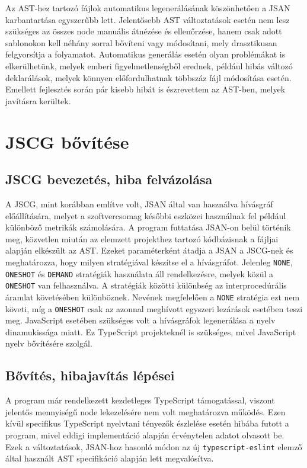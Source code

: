 Az AST-hez tartozó fájlok automatikus legenerálásának köszönhetően a JSAN karbantartása egyszerűbb lett. Jelentősebb AST változtatások esetén nem lesz szükséges az összes node manuális átnézése és ellenőrzése, hanem csak adott sablonokon kell néhány sorral bővíteni vagy módosítani, mely drasztikusan felgyorsítja a folyamatot. Automatikus generálás esetén olyan problémákat is elkerülhetünk, melyek emberi figyelmetlenségből erednek, például hibás változó deklarálások, melyek könnyen előfordulhatnak többszáz fájl módosítása esetén. Emellett fejlesztés során pár kisebb hibát is észrevettem az AST-ben, melyek javításra kerültek. 

\section{JSCG bővítése}

\subsection{JSCG bevezetés, hiba felvázolása}
A JSCG, mint korábban említve volt, JSAN által van használva hívásgráf előállítására, melyet a szoftvercsomag későbbi eszközei használnak fel például különböző metrikák számolására. A program futtatása JSAN-on belül történik meg, közvetlen miután az elemzett projekthez tartozó kódbázisnak a fájljai alapján elkészült az AST. Ezeket paraméterként átadja a JSAN a JSCG-nek és meghatározza, hogy milyen stratégiával készítse el a hívásgráfot. Jelenleg \texttt{NONE}, \texttt{ONESHOT} és \texttt{DEMAND} stratégiák használata áll rendelkezésre, melyek közül a \texttt{ONESHOT} van felhasználva. A stratégiák közötti különbség az interprocedúrális áramlat követésében különböznek. Nevének megfelelően a \texttt{NONE} stratégia ezt nem követi, míg a \texttt{ONESHOT} csak az azonnal meghívott egyszeri lezárások esetében teszi meg.
JavaScript esetében szükséges volt a hívásgráfok legenerálása a nyelv dinamukissága miatt\cite{feldthaus2013efficient}. Ez TypeScript projekteknél is szükséges, mivel JavaScript nyelv bővítésére szolgál.

\subsection{Bővítés, hibajavítás lépései}

A program már rendelkezett kezdetleges TypeScript támogatással, viszont jelentős mennyiségű node lekezelésére nem volt meghatározva működés. Ezen kívül specifikus TypeScript nyelvtani tényezők észlelése esetén hibába futott a program, mivel eddigi implementáció alapján érvénytelen adatot olvasott be. Ezek a változtatások, JSAN-hoz hasonló módon az új \texttt{typescript-eslint} elemző által használt AST specifikáció alapján lett megvalósítva.

